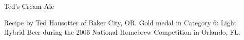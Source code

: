 \begin{recipe}{Ted's Cream Ale}

\begin{aboutblock}
Recipe by Ted Hausotter of Baker City, OR. Gold medal in Category 6: Light
Hybrid Beer during the 2006 National Homebrew Competition in Orlando, FL.
\sourceaha
\end{aboutblock}


\begin{methodandtiming}

\begin{mashsteps}
\end{mashsteps}

\begin{fermentationsteps}
\end{fermentationsteps}

\end{methodandtiming}

\recipebreak

\begin{ingredientsblock}

\begin{malts}
\end{malts}

\begin{hops}
\end{hops}


\end{ingredientsblock}

\end{recipe}

